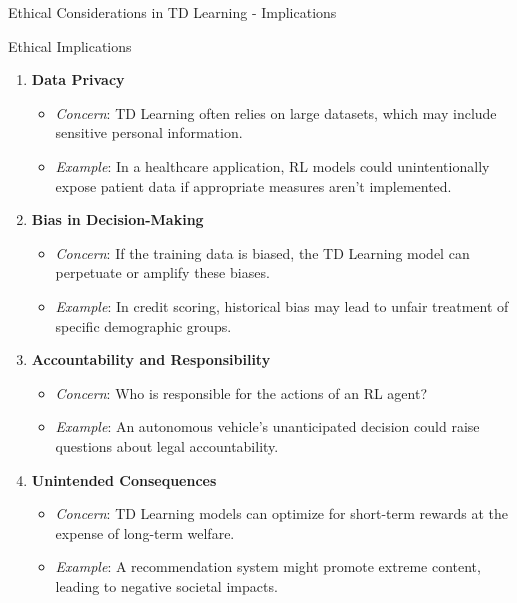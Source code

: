 \documentclass[aspectratio=169]{beamer}
\begin{document}
\begin{frame}[fragile]{Ethical Considerations in TD Learning - Implications}
    \begin{block}{Ethical Implications}
        \begin{enumerate}
            \item \textbf{Data Privacy}
            \begin{itemize}
                \item \textit{Concern}: TD Learning often relies on large datasets, which may include sensitive personal information.
                \item \textit{Example}: In a healthcare application, RL models could unintentionally expose patient data if appropriate measures aren’t implemented.
            \end{itemize}
            
            \item \textbf{Bias in Decision-Making}
            \begin{itemize}
                \item \textit{Concern}: If the training data is biased, the TD Learning model can perpetuate or amplify these biases.
                \item \textit{Example}: In credit scoring, historical bias may lead to unfair treatment of specific demographic groups.
            \end{itemize}
                
            \item \textbf{Accountability and Responsibility}
            \begin{itemize}
                \item \textit{Concern}: Who is responsible for the actions of an RL agent?
                \item \textit{Example}: An autonomous vehicle's unanticipated decision could raise questions about legal accountability.
            \end{itemize}
                
            \item \textbf{Unintended Consequences}
            \begin{itemize}
                \item \textit{Concern}: TD Learning models can optimize for short-term rewards at the expense of long-term welfare.
                \item \textit{Example}: A recommendation system might promote extreme content, leading to negative societal impacts.
            \end{itemize}
        \end{enumerate}
    \end{block}
\end{frame}
\end{document}
